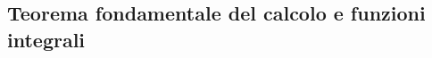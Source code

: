 \subsection{Teorema fondamentale del calcolo e funzioni integrali}
\label{sec:esercizi-integrali-teorema-fondamentale-del-calcolo}
